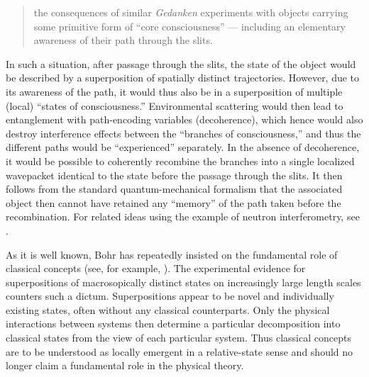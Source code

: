 \documentclass[twocolumn,aps,floatfix,amsmath,amssymb,showpacs,nofootinbib]{revtex4}
\begin{document}
\begin{quote}
  the consequences of similar \emph{Gedanken} experiments with objects
  carrying some primitive form of ``core consciousness'' --- including
  an elementary awareness of their path through the slits.
\end{quote}

In such a situation, after passage through the slits, the state of the
object would be described by a superposition of spatially distinct
trajectories. However, due to its awareness of the path, it would thus
also be in a superposition of multiple (local) ``states of
consciousness.''  Environmental scattering would then lead to
entanglement with path-encoding variables (decoherence), which hence
would also destroy interference effects between the ``branches of
consciousness,'' and thus the different paths would be ``experienced''
separately. In the absence of decoherence, it would be possible to
coherently recombine the branches into a single localized wavepacket
identical to the state before the passage through the slits.  It then
follows from the standard quantum-mechanical formalism that the
associated object then cannot have retained any ``memory'' of the path
taken before the recombination.  For related ideas using the example
of neutron interferometry, see \cite{Vaidmain:1998:zp}.

As it is well known, Bohr has repeatedly insisted on the fundamental
role of classical concepts (see, for example,
\cite{Bohr:1923:um,Bohr:1948:um}). The experimental evidence for
superpositions of macrosopically distinct states on increasingly large
length scales counters such a dictum. Superpositions appear to be
novel and individually existing states, often without any classical
counterparts.  Only the physical interactions between systems then
determine a particular decomposition into classical states from the
view of each particular system. Thus classical concepts are to be
understood as locally emergent in a relative-state sense and should no
longer claim a fundamental role in the physical theory.
\end{document}
